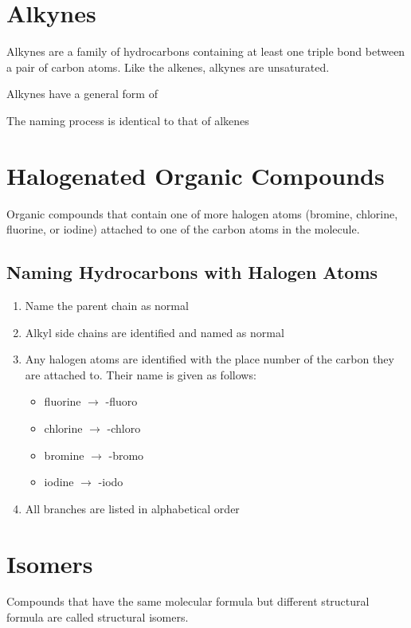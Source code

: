 \section{Alkynes} \label{08/05/2025}

	Alkynes are a family of hydrocarbons containing at least one triple bond between a pair of carbon atoms. Like the alkenes, alkynes are unsaturated.

	Alkynes have a general form of 

	The naming process is identical to that of alkenes

\section{Halogenated Organic Compounds}

	Organic compounds that contain one of more halogen atoms (bromine, chlorine, fluorine, or iodine) attached to one of the carbon atoms in the molecule.

	\subsection{Naming Hydrocarbons with Halogen Atoms}
	
		\begin{enumerate}
			\item Name the parent chain as normal
			\item Alkyl side chains are identified and named as normal
			\item Any halogen atoms are identified with the place number of the carbon they are attached to. Their name is given as follows:
				\begin{itemize}
					\item fluorine $\rightarrow$ -fluoro
					\item chlorine $\rightarrow$ -chloro
					\item bromine $\rightarrow$ -bromo
					\item iodine $\rightarrow$ -iodo
				\end{itemize}
			\item All branches are listed in alphabetical order
		\end{enumerate}

\section{Isomers}

	Compounds that have the same molecular formula but different structural formula are called structural isomers.

